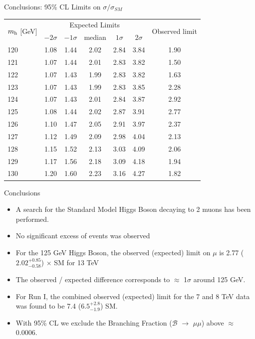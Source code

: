 \documentclass[pdf, 9pt]{beamer}
\begin{document}
  \begin{frame}{Conclusions: 95\% CL Limits on $\sigma/\sigma_{SM}$}
  \begin{center}
\begin{tabular}{lcccccc}
\hline
\multirow{2}{*}{$m_\textup{h}$ [GeV]} & \multicolumn{5}{c}{Expected Limits} & \multirow{2}{*}{Observed limit} \\
\cline{2-6}
& $-2\sigma$ & $-1\sigma$ & median  & $1\sigma$ & $2\sigma$ & \\
\hline
120 & 1.08 & 1.44 & 2.02 & 2.84 & 3.84 & 1.90\\
121 & 1.07 & 1.44 & 2.01 & 2.83 & 3.82 & 1.50\\
122 & 1.07 & 1.43 & 1.99 & 2.83 & 3.82 & 1.63\\
123 & 1.07 & 1.43 & 1.99 & 2.83 & 3.85 & 2.28\\
\alert{124} & \alert{1.07} & \alert{1.43} & \alert{2.01} & \alert{2.84} & \alert{3.87} & \alert{2.92}\\
\alert{125} & \alert{1.08} & \alert{1.44} & \alert{2.02} & \alert{2.87} & \alert{3.91} & \alert{2.77}\\
\alert{126} & \alert{1.10} & \alert{1.47} & \alert{2.05} & \alert{2.91} & \alert{3.97} & \alert{2.37}\\
127 & 1.12 & 1.49 & 2.09 & 2.98 & 4.04 & 2.13\\
128 & 1.15 & 1.52 & 2.13 & 3.03 & 4.09 & 2.06\\
129 & 1.17 & 1.56 & 2.18 & 3.09 & 4.18 & 1.94\\
130 & 1.20 & 1.60 & 2.23 & 3.16 & 4.27 & 1.82\\
\hline
\end{tabular}
\end{center}
  \end{frame}

  \begin{frame}{Conclusions}
    \begin{itemize}
      \item A search for the Standard Model Higgs Boson decaying to 2 muons has been performed.
      \item No significant excess of events was observed
      \item For the 125 GeV Higgs Boson, the observed (expected) limit on $\mu$ is 2.77 ($2.02^{+0.85}_{-0.58}$) $\times$ SM for 13 TeV
      \item The observed / expected difference corresponds to $\approx$ 1$\sigma$ around 125 GeV.
      \item For Run I, the combined observed (expected) limit for the 7 and 8 TeV data was found to be 7.4 ($6.5^{+2.8}_{-1.9}$) \times SM.
      \item \alert{With 95\% CL we exclude the Branching Fraction ($\mathcal{B}$ $\rightarrow$ $\mu\mu$) above $\approx$ 0.0006}.
    \end{itemize}
  \end{frame}
\end{document}
